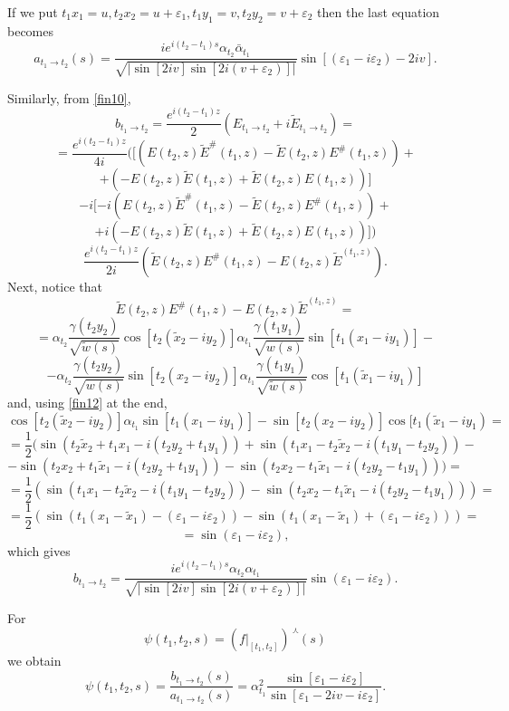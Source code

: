 \documentclass[11pt,twoside,reqno]{amsart}
\def\ti{\tilde}
\def\to{\rightarrow}
\def \nlhat {\overset{\ \curlywedge}}
\def\e{\varepsilon}
\def\g{\gamma}
\def\a{\alpha}
\theoremstyle{plain}
\numberwithin{equation}{section}
\begin{document}
If we put $t_1x_1=u, t_2x_2=u+\e_1, t_1y_1=v, t_2y_2=v+\e_2$ then the last equation
becomes
\begin{equation}
a_{t_1 \to t_2}(s)= \frac {i e^{i(t_2-t_1)s}\a_{t_2}\bar\a_{t_1}}{\sqrt{|\sin [2iv]\sin [2i(v+\e_2)]|}}\sin[(\e_1 -i\e_2)  - 2iv] .
\label{eqAAA}
\end{equation}



Similarly, from \eqref{fin10},
$$b_{t_1 \to t_2}=\frac {e^{i(t_2-t_1)z}}2(E_{t_1 \to t_2}+i \ti E_{t_1 \to t_2})=$$
$$=\frac {e^{i(t_2-t_1)z}}{4i}([(E(t_2,z)\ti E^\#(t_1,z)-\ti E(t_2,z)E^\#(t_1,z)) +$$$$+ (- E(t_2,z)\ti E(t_1,z) + \ti E(t_2,z)E(t_1,z))]
$$$$
-i[-i (E(t_2,z)\ti E^\#(t_1,z)-\ti E(t_2,z)E^\#(t_1,z)) +$$$$+i (- E(t_2,z)\ti E(t_1,z) + \ti E(t_2,z)E(t_1,z))])
$$
\begin{equation}\frac {e^{i(t_2-t_1)z}}{2i}( \ti E(t_2,z)E^\#(t_1,z)-E(t_2,z)\ti E^(t_1,z)) .
\label{fin11}\end{equation}
Next, notice that 
$$\ti E(t_2,z)E^\#(t_1,z)-E(t_2,z)\ti E^(t_1,z)=$$$$
=\a_{t_2}\frac{\g(t_2 y_2)}{\sqrt{\ti w(s)}}\cos [t_2(\ti x_2-iy_2)]  \a_{t_1}\frac{\g(t_1 y_1)}{\sqrt{ w(s)}}\sin [t_1(x_1-iy_1)] -$$ 
$$  - \a_{t_2}\frac{\g(t_2 y_2)}{\sqrt{w(s)}}\sin [t_2(x_2-iy_2)]\a_{t_1}\frac{\g(t_1 y_1)}{\sqrt{\ti w(s)}}\cos [t_1(\ti x_1-iy_1)]  $$
and, using \eqref{fin12} at the end, 
$$\cos [t_2(\ti x_2-iy_2)]  \a_{t_1}\sin [t_1(x_1-iy_1)] -\sin [t_2(x_2-iy_2)]\cos [t_1(\ti x_1-iy_1)=$$
$$=\frac 12 ( \sin  (t_2\ti x_2+t_1 x_1-i(t_2y_2+t_1y_1)) +\sin (t_1 x_1-t_2\ti x_2-i(t_1y_1-t_2y_2))  -
$$
$$-    \sin  (t_2 x_2+t_1 \ti x_1-i(t_2y_2+t_1y_1)) -\sin (t_2 x_2-t_1 \ti x_1-i(t_2y_2-t_1y_1))  )=$$
$$=
\frac 12( \sin (t_1 x_1-t_2\ti x_2-i(t_1y_1-t_2y_2)) -\sin (t_2 x_2-t_1 \ti x_1-i(t_2y_2-t_1y_1)) )=
$$
$$=
\frac 12(\sin (t_1(  x_1-\ti x_1)-(\e_1-i\e_2)) -\sin (t_1(  x_1-\ti x_1)+(\e_1-i\e_2)))=
$$
$$=\sin (\e_1-i\e_2),$$
which gives 
\begin{equation}b_{t_1 \to t_2}=\frac {i e^{i(t_2-t_1)s}\a_{t_2}\a_{t_1}}{\sqrt{|\sin [2iv]\sin [2i(v+\e_2)]|}}\sin (\e_1-i\e_2).
\label{eqBBB}\end{equation}

For 
$$\psi(t_1,t_2,s) =\left( f|_{[t_1,t_2]}   \right) \nlhat{\frac{}{} }(s)$$
we obtain
$$\psi(t_1,t_2,s)=\frac{b_{t_1 \to t_2}(s)}{a_{t_1 \to t_2}(s)}=\a_{t_1}^2\frac{\sin[\e_1   -i\e_2]}{\sin[\e_1   - 2iv-i\e_2] }.$$





\end{document}
